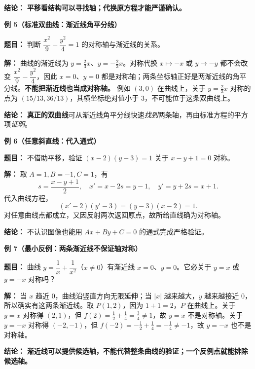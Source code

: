 \begin{examplebox}
\textbf{结论：} \textbf{平移看结构可以寻找轴；代换原方程才能严谨确认。}

\medskip
\textbf{\textcolor{CExample}{例 5（标准双曲线：渐近线角平分线）}}

\textbf{题目：} 判断 $\dfrac{x^2}{9}-\dfrac{y^2}{4}=1$ 的对称轴与渐近线的关系。

\textbf{解：} 曲线的渐近线为 $y=\frac23x$、$y=-\frac23x$。对称代换 $x\mapsto-x$ 或 $y\mapsto-y$ 都不会改变 $\dfrac{x^2}{9}-\dfrac{y^2}{4}$，因此 $\boxed{x=0}$、$\boxed{y=0}$ 都是对称轴；两条坐标轴正好是两渐近线的角平分线。\textbf{不能把渐近线也当成对称轴。} 例如 $(3,0)$ 在曲线上，关于 $y=\frac23x$ 对称的点为 $(15/13,36/13)$，其横坐标绝对值小于 $3$，不可能位于这条双曲线上。

\textbf{结论：} \textbf{真正的双曲线}可从渐近线角平分线快速\emph{找到}两条轴，再由标准方程的平方项\emph{证明}。

\medskip
\textbf{\textcolor{CExample}{例 6（任意斜直线：代入通式）}}

\textbf{题目：} 不借助平移，验证 $(x-2)(y-3)=1$ 关于 $x-y+1=0$ 对称。

\textbf{解：} 取 $A=1,B=-1,C=1$，有
\[
 s=\frac{x-y+1}{2},\quad
 x'=x-2s=y-1,\quad y'=y+2s=x+1.
\]
代入曲线方程，
\[
  (x'-2)(y'-3)=(y-3)(x-2)=1.
\]
对任意曲线点都成立，又因反射两次返回原点，故所给直线确为对称轴。

\textbf{结论：} 不认识图像也能用 $Ax+By+C=0$ 的通式完成严格验证。

\medskip
\textbf{\textcolor{CExample}{例 7（最小反例：两条渐近线不保证轴对称）}}

\textbf{题目：} 曲线 $y=\dfrac1x+\dfrac1{x^2}$（$x\ne0$）有渐近线 $x=0$、$y=0$。它必关于 $y=x$ 或 $y=-x$ 对称吗？

\textbf{解：} 当 $x$ 趋近 $0$，曲线沿竖直方向无限延伸；当 $|x|$ 越来越大，$y$ 越来越接近 $0$，所以确实有这两条渐近线。取 $P(1,2)$，因为 $1+1=2$，$P$ 在曲线上。关于 $y=x$ 对称得 $(2,1)$，但 $f(2)=\frac12+\frac14=\frac34\ne1$，故 $y=x$ 不是对称轴。关于 $y=-x$ 对称得 $(-2,-1)$，但 $f(-2)=-\frac12+\frac14=-\frac14\ne-1$，故 $y=-x$ 也不是对称轴。

\textbf{结论：} \textbf{渐近线可以提供候选轴，不能代替整条曲线的验证；一个反例点就能排除候选轴。}
\end{examplebox}
